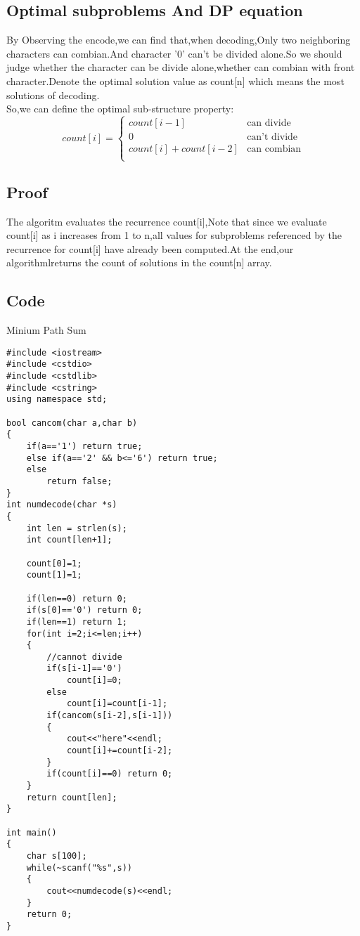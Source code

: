 \documentclass[]{article}
\begin{document}
\subsection{Optimal subproblems And DP equation}
By Observing the encode,we can find that,when decoding,Only two neighboring characters can combian.And character '0' can't be divided alone.So we should judge whether the character can be divide alone,whether can combian with front character.Denote the optimal solution value as count[n] which means the most solutions of decoding.\\
So,we can define the optimal sub-structure property:\\
	$$
	count[i] = \begin{cases}
	count[i-1] & \text{can divide} \\
	0 & \text{can't divide} \\
	count[i]+count[i-2] & \text{can combian} \\
	\end{cases}
	$$
\subsection{Proof}

The algoritm evaluates the recurrence count[i],Note that since we evaluate count[i] as i increases from 1 to n,all values for subproblems referenced by the recurrence for count[i] have already been computed.At the end,our algorithmlreturns the count of solutions in the count[n] array.

\subsection{Code}
\begin{algorithm}[H]
\caption{Minium Path Sum}
\begin{lstlisting}
#include <iostream>
#include <cstdio>
#include <cstdlib>
#include <cstring>
using namespace std;

bool cancom(char a,char b)
{
	if(a=='1') return true;
	else if(a=='2' && b<='6') return true;
	else
		return false;
}
int numdecode(char *s)
{
	int len = strlen(s);
	int count[len+1];

	count[0]=1;
	count[1]=1;

	if(len==0) return 0;
	if(s[0]=='0') return 0;
	if(len==1) return 1;
	for(int i=2;i<=len;i++)
	{
		//cannot divide
		if(s[i-1]=='0')
			count[i]=0;
		else
			count[i]=count[i-1];
		if(cancom(s[i-2],s[i-1]))
		{	
			cout<<"here"<<endl;
			count[i]+=count[i-2];
		}
		if(count[i]==0) return 0;
	}
	return count[len];
}

int main()
{
	char s[100];
	while(~scanf("%s",s))
	{
		cout<<numdecode(s)<<endl;
	}
	return 0;
}

\end{lstlisting}
\end{algorithm}
\end{document}
